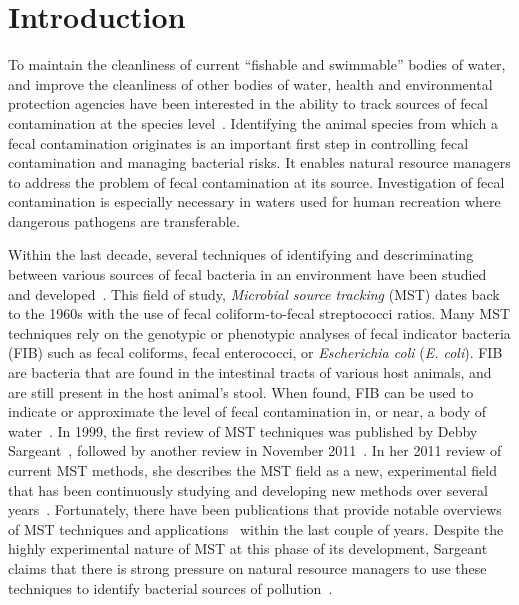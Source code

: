 \documentclass[12pt]{ucthesis}
\begin{document}
\pagestyle{plain}

\renewcommand{\baselinestretch}{1.66}


\chapter{Introduction}\label{chap:intro}
   To maintain the cleanliness of current ``fishable and swimmable'' bodies of
   water, and improve the cleanliness of other bodies of water, health and
   environmental protection agencies have been interested in the ability to
   track sources of fecal contamination at the species
   level~\cite{Scott:CurrentMST, Simpson:StateOf, Desmarais:SoilInfluence}.
   Identifying the animal species from which a fecal contamination originates
   is an important first step in controlling fecal contamination and managing
   bacterial risks. It enables natural resource managers to address the problem
   of fecal contamination at its source. Investigation of fecal contamination
   is especially necessary in waters used for human recreation where dangerous
   pathogens are transferable.

   Within the last decade, several techniques of identifying and descriminating
   between various sources of fecal bacteria in an environment have been
   studied and developed~\cite{Sargeant:ReviewMST, Hagedorn:MST_TMDL,
   Lowe:FocusMST, Rivera:MSTCharacterization, Cornelison:MSTTools,
   Chase:FloridaMST}. This field of study, \textit{Microbial source tracking}
   (MST) dates back to the 1960s with the use of fecal coliform-to-fecal
   streptococci ratios. Many MST techniques rely on the genotypic or
   phenotypic analyses of fecal indicator bacteria (FIB) such as fecal
   coliforms, fecal enterococci, or \textit{Escherichia coli} (\textit{E.
   coli}). FIB are bacteria that are found in the intestinal tracts of various
   host animals, and are still present in the host animal's stool. When found,
   FIB can be used to indicate or approximate the level of fecal contamination
   in, or near, a body of water~\cite{Simpson:StateOf}. In 1999, the first
   review of MST techniques was published by Debby
   Sargeant~\cite{Sargeant:Methods}, followed by another review in November
   2011~\cite{Sargeant:ReviewMST}. In her 2011 review of current MST methods,
   she describes the MST field as a new, experimental field that has been
   continuously studying and developing new methods over several
   years~\cite{Sargeant:ReviewMST}. Fortunately, there have been publications
   that provide notable overviews of MST techniques and
   applications~\cite{Hagedorn:CaseStudies, Domingo:Current,
   Harwood:RapidMethods} within the last couple of years. Despite the highly
   experimental nature of MST at this phase of its development, Sargeant claims
   that there is strong pressure on natural resource managers to use these
   techniques to identify bacterial sources of
   pollution~\cite{Sargeant:ReviewMST}.
\end{document}
